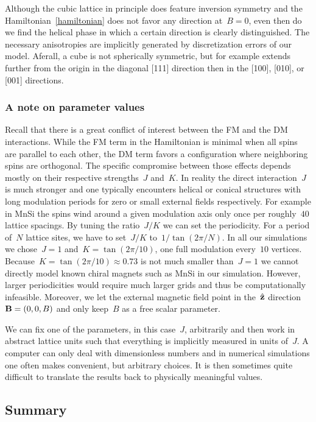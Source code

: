 Although the cubic lattice in principle does feature inversion symmetry and the
Hamiltonian~\eqref{hamiltonian} does not favor any direction at~$B=0$, even then
do we find the helical phase in which a certain direction is clearly
distinguished. The necessary anisotropies are implicitly generated by
discretization errors of our model. Aferall, a cube is not spherically
symmetric, but for example extends further from the origin in the diagonal [111]
direction then in the [100], [010], or [001] directions.

\subsubsection{A note on parameter values}

Recall that there is a great conflict of interest between the FM and the DM
interactions. While the FM term in the Hamiltonian is minimal when all spins are
parallel to each other, the DM term favors a configuration where neighboring
spins are orthogonal. The specific compromise between those effects depends
mostly on their respective strengths~$J$ and~$K$. In reality the direct
interaction~$J$ is much stronger and one typically encounters helical or conical
structures with long modulation periods for zero or small external fields
respectively. For example in MnSi the spins wind around a given modulation axis
only once per roughly~$40$ lattice spacings. By tuning the ratio~$J/K$ we can
set the periodicity. For a period of~$N$ lattice sites, we have to set~$J/K$
to~$1/\tan(2\pi / N)$. In all our simulations we chose~$J=1$ and~$K=\tan(2\pi /
10)$, \ie{} one full modulation every~$10$ vertices. Because~$K=\tan(2\pi /
10)\approx 0.73$ is not much smaller than~$J=1$ we cannot directly model known
chiral magnets such as MnSi in our simulation. However, larger periodicities
would require much larger grids and thus be computationally infeasible.
Moreover, we let the external magnetic field point in the~$\hat{\mathbf{z}}$
direction~$\mathbf{B}=(0,0,B)$ and only keep~$B$ as a free scalar parameter.

We can fix one of the parameters, in this case~$J$, arbitrarily and then work in
abstract lattice units such that everything is implicitly measured in units
of~$J$. A computer can only deal with dimensionless numbers and in numerical
simulations one often makes convenient, but arbitrary choices.  It is then
sometimes quite difficult to translate the results back to physically meaningful
values.

\subsection{Summary}

